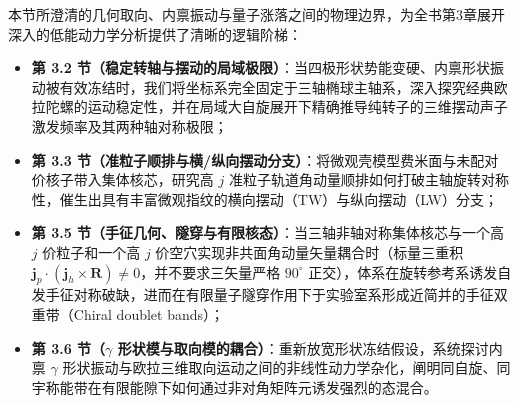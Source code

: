 本节所澄清的几何取向、内禀振动与量子涨落之间的物理边界，为全书第3章展开深入的低能动力学分析提供了清晰的逻辑阶梯：
\begin{itemize}
\item \textbf{第 3.2 节（稳定转轴与摆动的局域极限）}：当四极形状势能变硬、内禀形状振动被有效冻结时，我们将坐标系完全固定于三轴椭球主轴系，深入探究经典欧拉陀螺的运动稳定性，并在局域大自旋展开下精确推导纯转子的三维摆动声子激发频率及其两种轴对称极限；
\item \textbf{第 3.3 节（准粒子顺排与横/纵向摆动分支）}：将微观壳模型费米面与未配对价核子带入集体核芯，研究高 $j$ 准粒子轨道角动量顺排如何打破主轴旋转对称性，催生出具有丰富微观指纹的横向摆动（TW）与纵向摆动（LW）分支；
\item \textbf{第 3.5 节（手征几何、隧穿与有限核态）}：当三轴非轴对称集体核芯与一个高 $j$ 价粒子和一个高 $j$ 价空穴实现非共面角动量矢量耦合时（标量三重积 $\mathbf{j}_p \cdot (\mathbf{j}_h \times \mathbf{R}) \ne 0$，并不要求三矢量严格 $90^\circ$ 正交），体系在旋转参考系诱发自发手征对称破缺，进而在有限量子隧穿作用下于实验室系形成近简并的手征双重带（Chiral doublet bands）；
\item \textbf{第 3.6 节（$\gamma$ 形状模与取向模的耦合）}：重新放宽形状冻结假设，系统探讨内禀 $\gamma$ 形状振动与欧拉三维取向运动之间的非线性动力学杂化，阐明同自旋、同宇称能带在有限能隙下如何通过非对角矩阵元诱发强烈的态混合。
\end{itemize}
